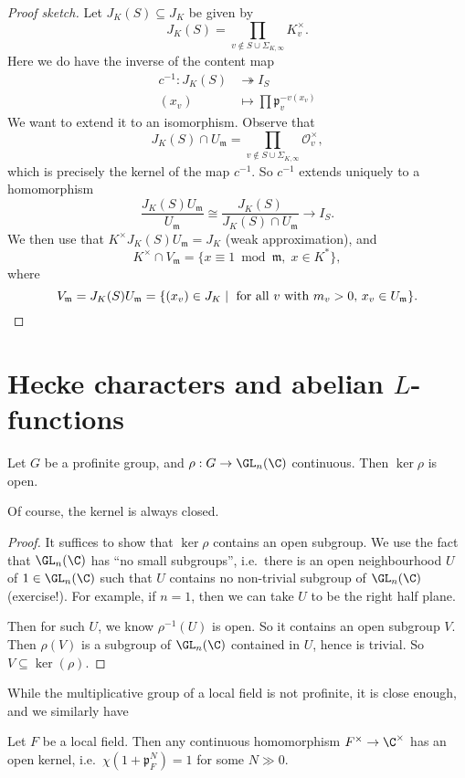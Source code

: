 \documentclass[a4paper]{article}
\begin{document}
\begin{proof}[Proof sketch]
  Let $J_K(S) \subseteq J_K$ be given by
  \[
    J_K(S) = \prod_{v \not\in S \cup \Sigma_{K, \infty}} K_v^\times.
  \]
  Here we do have the inverse of the content map
  \begin{align*}
    c^{-1}: J_K(S) &\twoheadrightarrow I_S\\
    (x_v) &\mapsto \prod \mathfrak{p}_v^{-v(x_v)}
  \end{align*}
  We want to extend it to an isomorphism. Observe that
  \[
    J_K(S) \cap U_\mathfrak{m} = \prod_{v \not \in S \cup \Sigma_{K, \infty}} \mathcal{O}_v^\times,
  \]
  which is precisely the kernel of the map $c^{-1}$. So $c^{-1}$ extends uniquely to a homomorphism
  \[
    \frac{J_K(S) U_\mathfrak{m}}{U_\mathfrak{m}} \cong \frac{J_K(S)}{J_K(S) \cap U_\mathfrak{m}} \to I_S.
  \]
  We then use that $K^\times J_K(S) U_\mathfrak{m} = J_K$ (weak approximation), and
  \[
    K^\times \cap V_\mathfrak{m} = \{x \equiv 1 \bmod{\mathfrak{m}},\; x \in K^*\},
  \]
  where
  \[
    V_\mathfrak{m} = J_K(S) U_\mathfrak{m} = \{(x_v)\in J_K \mid \text{ for all $v$ with $m_v > 0$, }x_v \in U_\mathfrak{m}\}.\qedhere
  \]
\end{proof}

\section{Hecke characters and abelian \texorpdfstring{$L$}{L}-functions}
\begin{prop}
  Let $G$ be a profinite group, and $\rho: G \to \GL_n(\C)$ continuous. Then $\ker \rho$ is open.
\end{prop}
Of course, the kernel is always closed.

\begin{proof}
  It suffices to show that $\ker \rho$ contains an open subgroup. We use the fact that $\GL_n(\C)$ has ``no small subgroups'', i.e.\ there is an open neighbourhood $U$ of $1 \in \GL_n(\C)$ such that $U$ contains no non-trivial subgroup of $\GL_n(\C)$ (exercise!). For example, if $n = 1$, then we can take $U$ to be the right half plane.

  Then for such $U$, we know $\rho^{-1}(U)$ is open. So it contains an open subgroup $V$. Then $\rho(V)$ is a subgroup of $\GL_n(\C)$ contained in $U$, hence is trivial. So $V \subseteq \ker (\rho)$.
\end{proof}

While the multiplicative group of a local field is not profinite, it is close enough, and we similarly have
\begin{ex}
  Let $F$ be a local field. Then any continuous homomorphism $F^\times \to \C^\times$ has an open kernel, i.e.\ $\chi(1 + \mathfrak{p}_F^N) = 1$ for some $N \gg 0$.
\end{ex}
\end{document}
